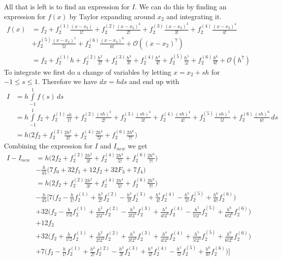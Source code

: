 \documentclass[12pt]{article}
\theoremstyle{remark}
\begin{document}
All that is left is to find an expression for $I$. We can do this by finding an expression for $f(x)$ by Taylor expanding around $x_2$ and integrating it.
\begin{align*}
f(x) & = f_2 + f^{(1)}_2\frac{(x-x_2)}{1!} + f^{(2)}_2\frac{(x-x_2)^2}{2!} + f^{(3)}_2\frac{(x-x_2)^3}{3!} + f^{(4)}_2\frac{(x-x_2)^4}{4!}
\\ & + f^{(5)}_2\frac{(x-x_2)^5}{5!} + f^{(6)}_2\frac{(x-x_2)^6}{6!} + \mathcal{O}((x-x_2)^7) \\
& = f_2 + f^{(1)}_2h + f_2^{(2)}\frac{h^2}{2!} + f_2^{(3)}\frac{h^3}{3!} + f_2^{(4)}\frac{h^4}{4!} + f_2^{(5)}\frac{h^5}{5!} + f_2^{(6)}\frac{h^6}{6!} + \mathcal{O}(h^7)
\end{align*}
To integrate we first do a change of variables by letting $x = x_2 + sh$ for $-1 \leq s \leq 1$. Therefore we have $dx = hds$ and end up with
\begin{align*}
I & = h\int\limits_{-1}^1 f(s) \, ds
\\ & = h\int\limits_{-1}^1 f_2 + f^{(1)}_2\frac{sh}{1!} + f_2^{(2)}\frac{(sh)^2}{2!} + f_2^{(3)}\frac{(sh)^3}{3!} + f_2^{(4)}\frac{(sh)^4}{4!} + f_2^{(5)}\frac{(sh)^5}{5!} + f_2^{(6)}\frac{(sh)^6}{6!} \, ds
\\ & = h\bigg(2f_2 + f_2^{(2)}\frac{2h^2}{3!} + f_2^{(4)}\frac{2h^4}{5!} + f_2^{(6)}\frac{2h^6}{7!}\bigg)
\end{align*}
Combining the expression for $I$ and $I_{new}$ we get
\begin{align*}
	I - I_{new} & = h\bigg(2f_2 + f_2^{(2)}\frac{2h^2}{3!} + f_2^{(4)}\frac{2h^4}{5!} + f_2^{(6)}\frac{2h^6}{7!}\bigg)
	\\ & - \frac{h}{45}\bigg(7f_0 + 32f_1 + 12f_2 + 32F_3 + 7f_4\bigg)
	\\ & = h\bigg(2f_2 + f_2^{(2)}\frac{2h^2}{3!} + f_2^{(4)}\frac{2h^4}{5!} + f_2^{(6)}\frac{2h^6}{7!}\bigg)
	\\ & - \frac{h}{45}\bigg[7\bigg(f_2 - \frac{h}{1!}f_2^{(1)} + \frac{h^2}{2!}f_2^{(2)} - \frac{h^3}{3!}f_2^{(3)} + \frac{h^4}{4!}f_2^{(4)} - \frac{h^5}{5!}f_2^{(5)} + \frac{h^6}{6!}f_2^{(6)} \bigg)
	\\ & + 32\bigg(f_2 - \frac{h}{1!2}f_2^{(1)} + \frac{h^2}{2!2^2}f_2^{(2)} - \frac{h^3}{3!2^3}f_2^{(3)} + \frac{h^4}{4!2^4}f_2^{(4)} - \frac{h^5}{5!2^5}f_2^{(5)} + \frac{h^6}{6!2^6}f_2^{(6)}\bigg)
	\\ & + 12f_2
	\\ & + 32\bigg(f_2 + \frac{h}{1!2}f_2^{(1)} + \frac{h^2}{2!2^2}f_2^{(2)} + \frac{h^3}{3!2^3}f_2^{(3)} + \frac{h^4}{4!2^4}f_2^{(4)} + \frac{h^5}{5!2^5}f_2^{(5)} + \frac{h^6}{6!2^6}f_2^{(6)}\bigg)
	\\ & + 7\bigg(f_2 - \frac{h}{1!}f_2^{(1)} + \frac{h^2}{2!}f_2^{(2)} - \frac{h^3}{3!}f_2^{(3)} + \frac{h^4}{4!}f_2^{(4)} - \frac{h^5}{5!}f_2^{(5)} + \frac{h^6}{6!}f_2^{(6)} \bigg)\bigg]
\end{align*}
\end{document}
